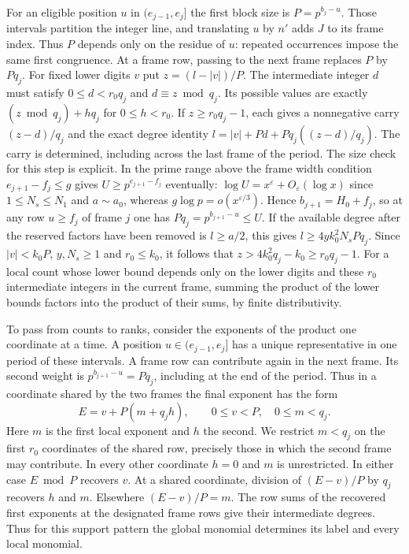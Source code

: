 \documentclass[11pt]{amsart}
\theoremstyle{definition}
\theoremstyle{remark}
\begin{document}
For an eligible position $u$ in $(e_{j-1},e_j]$ the first block
size is $P=p^{b_j-u}$. Those intervals partition the integer line,
and translating $u$ by $n'$ adds $J$ to its frame index. Thus
$P$ depends only on the residue of $u$: repeated occurrences impose
the same first congruence. At a frame row, passing to the next
frame replaces $P$ by $Pq_j$. For fixed lower digits $v$ put
$z=(l-|v|)/P$. The intermediate integer $d$ must satisfy
$0\le d<r_0q_j$ and $d\equiv z\bmod q_j$. Its possible values
are exactly $(z\bmod q_j)+h q_j$ for $0\le h<r_0$.
If $z\ge r_0q_j-1$, each gives a nonnegative carry $(z-d)/q_j$
and the exact degree identity
$l=|v|+Pd+Pq_j((z-d)/q_j)$. The carry is determined, including
across the last frame of the period. The size check for this step
is explicit. In the prime range above the frame width condition
$e_{j+1}-f_j\le g$ gives $U\ge p^{e_{j+1}-f_j}$ eventually:
$\log U=x^\varepsilon+O_\varepsilon(\log x)$ since
$1\le N_s\le N_1$ and $a\sim a_0$, whereas
$g\log p=o(x^{\varepsilon/3})$. Hence $b_{j+1}=H_0+f_j$,
so at any row $u\ge f_j$ of frame $j$ one has
$Pq_j=p^{b_{j+1}-u}\le U$. If the available degree after the
reserved factors have been removed is $l\ge a/2$, this gives
$l\ge4yk_0^2N_s Pq_j$. Since $|v|<k_0P$, $y,N_s\ge1$ and
$r_0\le k_0$, it follows that $z>4k_0^2 q_j-k_0\ge r_0q_j-1$.
For a local count whose
lower bound depends only on the lower digits and these $r_0$
intermediate integers in the current frame, summing the product
of the lower bounds factors into the product of their sums, by
finite distributivity.

To pass from counts to ranks, consider the exponents of the product
one coordinate at a time. A position $u\in(e_{j-1},e_j]$ has a
unique representative in one period of these intervals. A frame row
can contribute again in the next frame. Its second weight is
$p^{b_{j+1}-u}=Pq_j$, including at the end of the period. Thus in
a coordinate shared by the two frames the final exponent has the form
\[
                 E=v+P(m+q_j h),\qquad 0\le v<P,\quad 0\le m<q_j .
\]
Here $m$ is the first local exponent and $h$ the second. We restrict
$m<q_j$ on the first $r_0$ coordinates of the shared row, precisely
those in which the second frame may contribute. In every other
coordinate $h=0$ and $m$ is unrestricted.
In either case $E\bmod P$ recovers $v$. At a shared coordinate,
division of $(E-v)/P$ by $q_j$ recovers $h$ and $m$. Elsewhere
$(E-v)/P=m$. The row sums of the recovered first exponents at the
designated frame rows give their intermediate degrees. Thus for
this support pattern the global monomial determines its label
and every local monomial.
\end{document}
